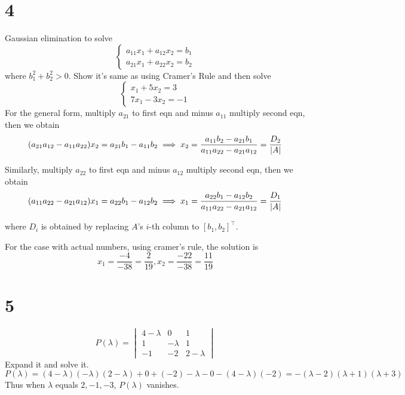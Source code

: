 \documentclass{article}
\begin{document}
\section*{4}
\begin{myleftlinebox}
    Gaussian elimination to solve 
    \[
        \begin{cases}
            a_{11}x_1 + a_{12} x_2 = b_1\\
            a_{21}x_1 + a_{22} x_2 = b_2
        \end{cases}
    \]
    where \(b_1^2+b_2^2>0\). Show it's same as using Cramer's Rule and then solve
    \[
        \begin{cases}
            x_1 + 5 x_2 = 3\\
            7 x_1 -3 x_2 = -1
        \end{cases}
    \]
    \tcblower
    For the general form, multiply \(a_{21}\) to first eqn and minus \(a_{11}\) multiply second eqn, then we obtain 
    \[(a_{21}a_{12}-a_{11}a_{22})x_2 = a_{21}b_1-a_{11}b_2\implies x_2 = \frac{a_{11}b_2 - a_{21}b_1}{a_{11}a_{22}-a_{21}a_{12}} = \frac{D_2}{\left\vert A\right\vert}\]

    Similarly, multiply \(a_{22}\) to first eqn and minus \(a_{12}\) multiply second eqn, then we obtain 
    \[(a_{11}a_{22} - a_{21}a_{12})x_1 = a_{22}b_1-a_{12}b_2\implies x_1= \frac{a_{22}b_1-a_{12}b_2}{a_{11}a_{22}-a_{21}a_{12}} = \frac{D_1}{\left\vert A\right\vert}\]
    
    where \(D_i\) is obtained by replacing \(A\)'s \(i\)-th column to \([b_1,b_2]^\top\).

    For the case with actual numbers, using cramer's rule, the solution is
    \[
        x_1 = \frac{-4}{-38}=\frac{2}{19}, x_2 = \frac{-22}{-38} = \frac{11}{19}
    \]
\end{myleftlinebox}

\section*{5}
\begin{myleftlinebox}
    \[P(\lambda) = \begin{vmatrix}
        4-\lambda & 0 & 1\\
        1 & -\lambda & 1\\
        -1 & -2 & 2-\lambda 
    \end{vmatrix}
    \]
    Expand it and solve it.
    \tcblower
    \[
        P(\lambda) = (4-\lambda)(-\lambda)(2-\lambda)+0+(-2)-\lambda-0-(4-\lambda)(-2)=-(\lambda-2)(\lambda+1)(\lambda+3)
    \]
    Thus when \(\lambda\) equals \(2,-1,-3\), \(P(\lambda)\) vanishes.
\end{myleftlinebox}
\end{document}
